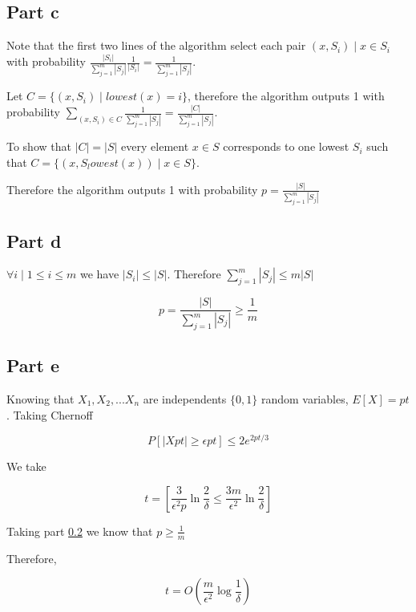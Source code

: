 \documentclass[12pt, a4paper]{article}
\begin{document}
\subsection{Part c}
Note that the first two lines of the algorithm select each pair $(x,S_i) \mid x
\in S_i$ with probability $\frac{|S_i|}{\sum_{j=1}^{m}|S_j|}\frac{1}{|S_i|} =
\frac{1}{\sum_{j=1}^{m}|S_j|}$.

Let $C = \{(x,S_i) \mid lowest(x) = i\}$, therefore the algorithm outputs 1 with
probability $\sum_{(x,S_i) \in C}\frac{1}{\sum_{j=1}^{m}|S_j|} =
\frac{|C|}{\sum_{j=1}^{m}|S_j|}$.

To show that $|C| = |S|$ every element $x \in S$ corresponds to one lowest $S_i$
such that $C = \{(x,S_lowest(x)) \mid x \in S\}$.

Therefore the algorithm outputs 1 with probability $p = \frac{|S|}{\sum_{j=1}^{m}|S_j|}$

\subsection{Part d}\label{part:d}
$\forall i \mid 1 \leq i \leq m$ we have $|S_i| \leq |S|$. Therefore
$\sum_{j=1}^{m}|S_j| \leq m|S|$

\begin{equation}
  p = \frac{|S|}{\sum_{j=1}^{m}|S_j|} \geq \frac{1}{m}
\end{equation}

\subsection{Part e}\label{part:e}
Knowing that $X_1, X_2, ... X_n$ are independents $\{0,1\}$ random variables,
$E[X]=pt$. Taking Chernoff

\begin{equation}
  P[|Xpt| \geq \epsilon p t] \leq 2e^{2pt/3}
\end{equation}

We take

\begin{equation}
t = \left[ \frac{3}{\epsilon^2 p}\ln{\frac{2}{\delta}} \leq
  \frac{3m}{\epsilon^2} \ln{\frac{2}{\delta}}\right]
\end{equation}

Taking part \ref{part:d} we know that $p \geq \frac{1}{m}$

Therefore,

\begin{equation}
  t = O\left( \frac{m}{\epsilon^2}\log{\frac{1}{\delta}} \right)
\end{equation}
\end{document}
